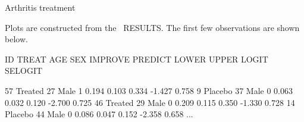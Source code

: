 \begin{Example}[arthrit10]{Arthritis treatment}
\begin{Output}[htb]
\caption{Arthritis data: Overall tests and parameter estimates}\label{out:glogist1.1}
\small

\end{Output}

Plots are constructed from the \Dset\ RESULTS.  The first few
observations are shown below.

\begin{output}
   ID   TREAT   AGE   SEX  IMPROVE  PREDICT   LOWER   UPPER   LOGIT SELOGIT

   57  Treated   27  Male     1       0.194   0.103   0.334  -1.427   0.758
    9  Placebo   37  Male     0       0.063   0.032   0.120  -2.700   0.725
   46  Treated   29  Male     0       0.209   0.115   0.350  -1.330   0.728
   14  Placebo   44  Male     0       0.086   0.047   0.152  -2.358   0.658
     ...
\end{output}



\end{Example}
